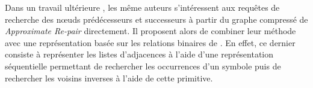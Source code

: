 
	Dans un travail ultérieure \citep{claude2010extended} , les même auteurs s'intéressent aux requêtes de recherche des nœuds prédécesseurs et successeurs à partir du graphe compressé de \textit{Approximate Re-pair} directement. Il proposent alors de combiner leur méthode avec une représentation basée sur les relations binaires de \citep{barbay2006adaptive}. En effet, ce dernier consiste à représenter les listes d'adjacences à l'aide d'une représentation séquentielle permettant de rechercher les occurrences d'un symbole puis de rechercher les voisins inverses à l'aide de cette primitive. 